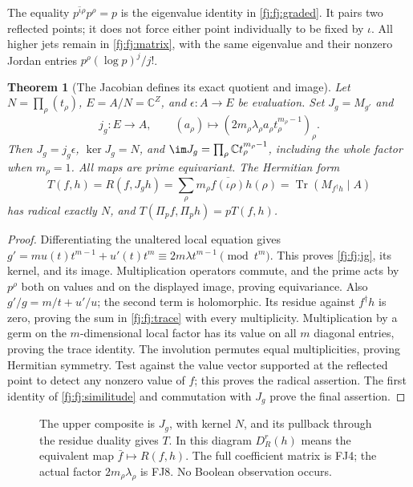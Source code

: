 \documentclass[11pt,a4paper]{article}
\newtheorem{theorem}{Theorem}[section]
\theoremstyle{definition}\newtheorem{definition}[theorem]{Definition}
\newcommand{\C}{\mathbb C}\newcommand{\R}{\mathbb R}
\providecommand{\Tr}{\operatorname{Tr}}
\begin{document}
The equality $\overline{p^{\iota\rho}}p^\rho=p$ is the eigenvalue
identity in \eqref{fj:fj:graded}. It pairs two reflected points; it does
not force either point individually to be fixed by $\iota$.
All higher jets remain in \eqref{fj:fj:matrix}, with the same eigenvalue
and their nonzero Jordan entries $p^\rho(\log p)^j/j!$.

\begin{theorem}[The Jacobian defines its exact quotient and image]
\label{fj:thm:jacobian}
Let $N=\prod_\rho(t_\rho)$, $E=A/N=\C^Z$, and
$\epsilon:A\to E$ be evaluation. Set $J_g=M_{g'}$ and
\[
 j_g:E\longrightarrow A,\qquad
 (a_\rho)\longmapsto
 (2m_\rho\lambda_\rho a_\rho t_\rho^{m_\rho-1})_\rho.
 \tag{FJ8}\label{fj:fj:jg}
\]
Then $J_g=j_g\epsilon$, $\ker J_g=N$, and
$\im J_g=\prod_\rho\C t_\rho^{m_\rho-1}$, including the whole factor
when $m_\rho=1$. All maps are prime equivariant. The Hermitian form
\[
 T(f,h)=R(f,J_gh)
       =\sum_\rho m_\rho\overline{f(\iota\rho)}h(\rho)
       =\Tr(M_{f^\dagger h}\mid A)
 \tag{FJ9}\label{fj:fj:trace}
\]
has radical exactly $N$, and $T(\Pi_pf,\Pi_ph)=pT(f,h)$.
\end{theorem}
\begin{proof}
Differentiating the unaltered local equation gives
$g'=mu(t)t^{m-1}+u'(t)t^m\equiv2m\lambda t^{m-1}\pmod {t^m}$.
This proves \eqref{fj:fj:jg}, its kernel, and its image. Multiplication
operators commute, and the prime acts by $p^\rho$ both on values and
on the displayed image, proving equivariance. Also
$g'/g=m/t+u'/u$; the second term is holomorphic. Its residue against
$f^\dagger h$ is zero, proving the sum in \eqref{fj:fj:trace} with every
multiplicity. Multiplication by a germ on the $m$-dimensional local
factor has its value on all $m$ diagonal entries, proving the trace
identity. The involution permutes equal multiplicities, proving
Hermitian symmetry. Test against the value vector supported at the
reflected point to detect any nonzero value of $f$; this proves the
radical assertion. The first identity of \eqref{fj:fj:similitude} and
commutation with $J_g$ prove the final assertion.
\end{proof}

\begin{figure}[ht]
\centering
{}
\caption{The upper composite is $J_g$, with kernel $N$, and its
pullback through the residue duality gives $T$. In this diagram
$D_R^r(h)$ means the equivalent map $\bar f\mapsto R(f,h)$.
The full coefficient matrix is FJ4; the actual factor
$2m_\rho\lambda_\rho$ is FJ8. No Boolean observation occurs.}
\label{fj:fig:jacobian}
\end{figure}
\end{document}
